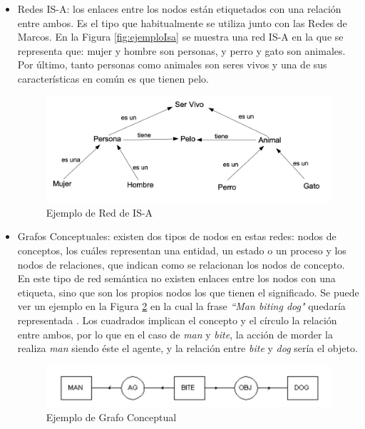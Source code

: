 \begin{itemize}
	\item Redes IS-A: los enlaces entre los nodos están etiquetados con una relación entre ambos. Es el tipo que habitualmente se utiliza junto con las Redes de Marcos. En la Figura \ref{fig:ejemploIsa} se muestra una red IS-A en la que se representa que: mujer y hombre son personas, y perro y gato son animales. Por último, tanto personas como animales son seres vivos y una de sus características en común es que tienen pelo.
	\begin{figure}[!h]
		\includegraphics[width=.9\textwidth]{Imagenes/Bitmap/Capitulo2/ejemploRedIsa.png}
		\caption{Ejemplo de Red de IS-A}
		\label{fig:ejemploMarco}
	\end{figure}

	\item Grafos Conceptuales: existen dos tipos de nodos en estas redes: nodos de conceptos, los cuáles representan una entidad, un estado o un proceso y los nodos de relaciones, que indican como se relacionan los nodos de concepto. En este tipo de red semántica no existen enlaces entre los nodos con una etiqueta, sino que son los propios nodos los que tienen el significado. Se puede ver un ejemplo en la Figura \ref{fig:grafoConceptual} en la cual la frase \textit{``Man biting dog"} quedaría representada \citep{osti_5673179}. Los cuadrados implican el concepto y el círculo la relación entre ambos, por lo que en el caso de \textit{man} y \textit{bite}, la acción de morder la realiza \textit{man} siendo éste el agente, y la relación entre \textit{bite} y \textit{dog} sería el objeto.
	\begin{figure}[!h]
		\includegraphics[width=.9\textwidth]{Imagenes/Bitmap/Capitulo2/grafoConceptual.png}
		\caption{Ejemplo de Grafo Conceptual}
		\label{fig:grafoConceptual}
	\end{figure}
\end{itemize}


